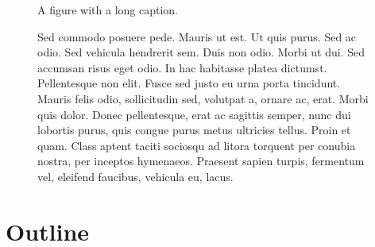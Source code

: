\begin{figure}
\centering
A figure with a long caption.
\par
\caption{Sed commodo posuere pede. Mauris ut est. Ut quis purus. Sed ac odio.
Sed vehicula hendrerit sem. Duis non odio. Morbi ut dui. Sed accumsan risus eget odio.
In hac habitasse platea dictumst. Pellentesque non elit. Fusce sed justo eu urna porta tincidunt.
Mauris felis odio, sollicitudin sed, volutpat a, ornare ac, erat.
Morbi quis dolor.
Donec pellentesque, erat ac sagittis semper, nunc dui lobortis purus, quis congue purus metus ultricies tellus.
Proin et quam.
Class aptent taciti sociosqu ad litora torquent per conubia nostra, per inceptos hymenaeos.
Praesent sapien turpis, fermentum vel, eleifend faucibus, vehicula eu, lacus.%
}
\end{figure}

\section{Outline}
\label{sec_outline}
